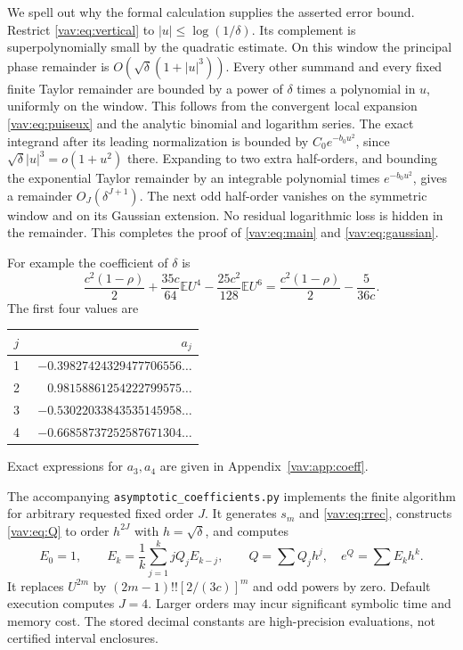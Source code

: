 \documentclass[11pt]{article}
\theoremstyle{remark}\newtheorem{remark}[theorem]{Remark}
\newcommand{\E}{\mathbb E}
\begin{document}
We spell out why the formal calculation supplies the asserted error
bound. Restrict \eqref{vav:eq:vertical} to $|u|\le\log(1/\delta)$.
Its complement is superpolynomially small by the quadratic estimate.
On this window the principal phase remainder is
$O(\sqrt\delta(1+|u|^3))$. Every other summand and every fixed finite
Taylor remainder are bounded by a power of $\delta$ times a polynomial
in $u$, uniformly on the window. This follows from the convergent
local expansion \eqref{vav:eq:puiseux} and the analytic binomial and
logarithm series. The exact integrand after its leading normalization
is bounded by $C_0e^{-b_0u^2}$, since
$\sqrt\delta|u|^3=o(1+u^2)$ there. Expanding to two extra half-orders,
and bounding the exponential Taylor remainder by an integrable
polynomial times $e^{-b_0u^2}$, gives a remainder
$O_J(\delta^{J+1})$. The next odd half-order vanishes on the symmetric
window and on its Gaussian extension. No residual logarithmic loss
is hidden in the remainder. This completes the proof of
\eqref{vav:eq:main} and \eqref{vav:eq:gaussian}.

For example the coefficient of $\delta$ is
\[
 \frac{c^2(1-\rho)}2+\frac{35c}{64}\E U^4
                    -\frac{25c^2}{128}\E U^6
 =\frac{c^2(1-\rho)}2-\frac5{36c}.
\]
The first four values are
\begin{center}
\begin{tabular}{cr}
\toprule
$j$ & $a_j$\\\midrule
1 & $-0.39827424329477706556\ldots$\\
2 & $\phantom{-}0.98158861254222799575\ldots$\\
3 & $-0.53022033843535145958\ldots$\\
4 & $-0.66858737252587671304\ldots$\\
\bottomrule
\end{tabular}
\end{center}
Exact expressions for $a_3,a_4$ are given in Appendix~\ref{vav:app:coeff}.

The accompanying \texttt{asymptotic\_coefficients.py} implements the
finite algorithm for arbitrary requested fixed order $J$.
It generates $s_m$ and \eqref{vav:eq:rrec}, constructs \eqref{vav:eq:Q} to
order $h^{2J}$ with $h=\sqrt\delta$, and computes
\begin{equation}\label{vav:eq:exprec}
 E_0=1,\qquad E_k=\frac1k\sum_{j=1}^k jQ_jE_{k-j},
 \qquad Q=\sum Q_jh^j,\quad e^Q=\sum E_kh^k.
\end{equation}
It replaces $U^{2m}$ by $(2m-1)!![2/(3c)]^m$ and odd powers by zero.
Default execution computes $J=4$. Larger orders may incur significant
symbolic time and memory cost. The stored decimal constants are
high-precision evaluations, not certified interval enclosures.
\end{document}
